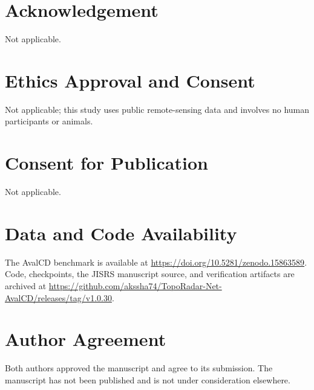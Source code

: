 \documentclass[10pt,a4paper]{article}
\begin{document}
\section*{Acknowledgement}
Not applicable.

\section*{Ethics Approval and Consent}
Not applicable; this study uses public remote-sensing data and involves no human participants or animals.

\section*{Consent for Publication}
Not applicable.

\section*{Data and Code Availability}
The AvalCD benchmark is available at \url{https://doi.org/10.5281/zenodo.15863589}. Code, checkpoints, the JISRS manuscript source, and verification artifacts are archived at \url{https://github.com/akssha74/TopoRadar-Net-AvalCD/releases/tag/v1.0.30}.

\section*{Author Agreement}
Both authors approved the manuscript and agree to its submission. The manuscript has not been published and is not under consideration elsewhere.
\end{document}
